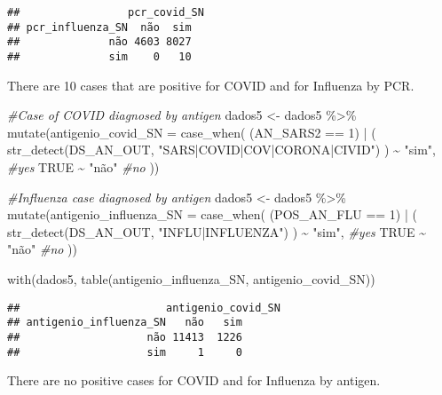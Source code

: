 \documentclass[
]{article}
\newenvironment{Shaded}{\begin{snugshade}}{\end{snugshade}}
\newcommand{\AttributeTok}[1]{\textcolor[rgb]{0.77,0.63,0.00}{#1}}
\newcommand{\CommentTok}[1]{\textcolor[rgb]{0.56,0.35,0.01}{\textit{#1}}}
\newcommand{\ConstantTok}[1]{\textcolor[rgb]{0.00,0.00,0.00}{#1}}
\newcommand{\DecValTok}[1]{\textcolor[rgb]{0.00,0.00,0.81}{#1}}
\newcommand{\FunctionTok}[1]{\textcolor[rgb]{0.00,0.00,0.00}{#1}}
\newcommand{\NormalTok}[1]{#1}
\newcommand{\OtherTok}[1]{\textcolor[rgb]{0.56,0.35,0.01}{#1}}
\newcommand{\SpecialCharTok}[1]{\textcolor[rgb]{0.00,0.00,0.00}{#1}}
\newcommand{\StringTok}[1]{\textcolor[rgb]{0.31,0.60,0.02}{#1}}
\begin{document}
\begin{verbatim}
##                 pcr_covid_SN
## pcr_influenza_SN  não  sim
##              não 4603 8027
##              sim    0   10
\end{verbatim}

There are 10 cases that are positive for COVID and for Influenza by PCR.

\begin{Shaded}
\begin{Highlighting}[]
\CommentTok{\#Case of COVID diagnosed by antigen}
\NormalTok{dados5 }\OtherTok{\textless{}{-}}\NormalTok{ dados5 }\SpecialCharTok{\%\textgreater{}\%}
  \FunctionTok{mutate}\NormalTok{(}\AttributeTok{antigenio\_covid\_SN =} \FunctionTok{case\_when}\NormalTok{(}
\NormalTok{    (AN\_SARS2 }\SpecialCharTok{==} \DecValTok{1}\NormalTok{) }\SpecialCharTok{|}
\NormalTok{      (}
        \FunctionTok{str\_detect}\NormalTok{(DS\_AN\_OUT, }\StringTok{"SARS|COVID|COV|CORONA|CIVID"}\NormalTok{) }
\NormalTok{      ) }\SpecialCharTok{\textasciitilde{}} \StringTok{"sim"}\NormalTok{, }\CommentTok{\#yes}
    \ConstantTok{TRUE} \SpecialCharTok{\textasciitilde{}} \StringTok{"não"} \CommentTok{\#no}
\NormalTok{  ))}


\CommentTok{\#Influenza case diagnosed by antigen}
\NormalTok{dados5 }\OtherTok{\textless{}{-}}\NormalTok{ dados5 }\SpecialCharTok{\%\textgreater{}\%}
  \FunctionTok{mutate}\NormalTok{(}\AttributeTok{antigenio\_influenza\_SN =} \FunctionTok{case\_when}\NormalTok{(}
\NormalTok{    (POS\_AN\_FLU }\SpecialCharTok{==} \DecValTok{1}\NormalTok{) }\SpecialCharTok{|}
\NormalTok{      (}
        \FunctionTok{str\_detect}\NormalTok{(DS\_AN\_OUT, }\StringTok{"INFLU|INFLUENZA"}\NormalTok{) }
\NormalTok{      ) }\SpecialCharTok{\textasciitilde{}} \StringTok{"sim"}\NormalTok{, }\CommentTok{\#yes}
    \ConstantTok{TRUE} \SpecialCharTok{\textasciitilde{}} \StringTok{"não"} \CommentTok{\#no}
\NormalTok{  ))}

\FunctionTok{with}\NormalTok{(dados5, }\FunctionTok{table}\NormalTok{(antigenio\_influenza\_SN, antigenio\_covid\_SN))}
\end{Highlighting}
\end{Shaded}

\begin{verbatim}
##                       antigenio_covid_SN
## antigenio_influenza_SN   não   sim
##                    não 11413  1226
##                    sim     1     0
\end{verbatim}

There are no positive cases for COVID and for Influenza by antigen.
\end{document}
